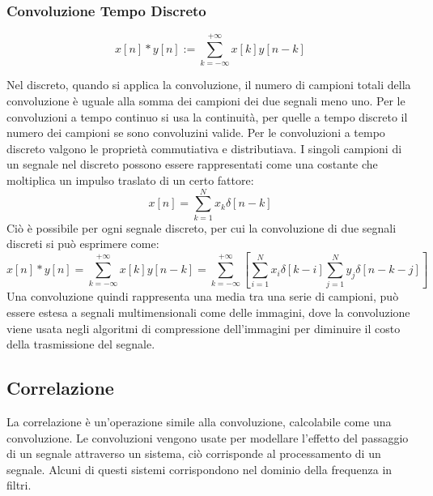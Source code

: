 \documentclass{article}
\numberwithin{equation}{subsection}
\begin{document}
\subsubsection{Convoluzione Tempo Discreto}

\begin{equation*}
    x[n]*y[n]:=\displaystyle\sum_{k=-\infty}^{+\infty}x[k]y[n-k]
\end{equation*}

Nel discreto, quando si applica la convoluzione, il numero di campioni totali della convoluzione è uguale alla somma dei campioni dei due segnali meno uno. Per le convoluzioni 
a tempo continuo si usa la continuità, per quelle a tempo discreto il numero dei campioni se sono convoluzini valide. Per le convoluzioni a tempo discreto valgono le proprietà 
commutiativa e distributiava. I singoli campioni di un segnale nel discreto possono essere rappresentati come una costante che moltiplica un impulso traslato di un certo fattore:
\begin{equation*}
    x[n]=\displaystyle\sum_{k=1}^Nx_k\delta[n-k]
\end{equation*}
Ciò è possibile per ogni segnale discreto, per cui la convoluzione di due segnali discreti si può esprimere come:
\begin{equation*}
    x[n]*y[n]=\displaystyle\sum_{k=-\infty}^{+\infty}x[k]y[n-k]=\sum_{k=-\infty}^{+\infty}\left[\sum_{i=1}^Nx_i\delta[k-i]\sum_{j=1}^Ny_j\delta[n-k-j]\right]
\end{equation*}
Una convoluzione quindi rappresenta una media tra una serie di campioni, può essere estesa a segnali multimensionali come delle immagini, dove la convoluzione viene 
usata negli algoritmi di compressione dell'immagini per diminuire il costo della trasmissione del segnale. 

\subsection{Correlazione}

La correlazione è un'operazione simile alla convoluzione, calcolabile come una convoluzione. Le convoluzioni vengono usate per modellare l'effetto del passaggio di un segnale 
attraverso un sistema, ciò corrisponde al processamento di un segnale. Alcuni di questi sistemi corrispondono nel dominio della frequenza in filtri. 
\end{document}
